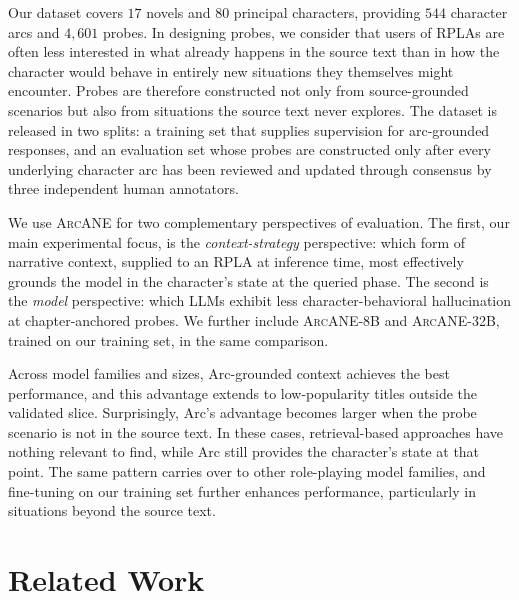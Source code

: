 \documentclass[11pt]{article}
\newcommand{\ours}{\textsc{ArcANE}}
\begin{document}
Our dataset covers $17$ novels and $80$ principal characters, providing $544$ character arcs and $4{,}601$ probes. In designing probes, we consider that users of RPLAs are often less interested in what already happens in the source text than in how the character would behave in entirely new situations they themselves might encounter. Probes are therefore constructed not only from source-grounded scenarios but also from situations the source text never explores. The dataset is released in two splits: a training set that supplies supervision for arc-grounded responses, and an evaluation set whose probes are constructed only after every underlying character arc has been reviewed and updated through consensus by three independent human annotators.

We use \ours{} for two complementary perspectives of evaluation. The first, our main experimental focus, is the \emph{context-strategy} perspective: which form of narrative context, supplied to an RPLA at inference time, most effectively grounds the model in the character's state at the queried phase. The second is the \emph{model} perspective: which LLMs exhibit less character-behavioral hallucination at chapter-anchored probes. We further include \ours{}-8B and \ours{}-32B, trained on our training set, in the same comparison.

Across model families and sizes, Arc-grounded context achieves the best performance, and this advantage extends to low-popularity titles outside the validated slice. Surprisingly, Arc's advantage becomes larger when the probe scenario is not in the source text. In these cases, retrieval-based approaches have nothing relevant to find, while Arc still provides the character's state at that point. The same pattern carries over to other role-playing model families, and fine-tuning on our training set further enhances performance, particularly in situations beyond the source text.

\section{Related Work\label{sec:related}}
\end{document}
